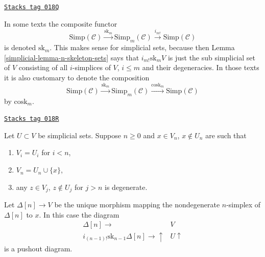 \begin{remark}[Sk literature]
\label{simplicial-remark-sk-literature}
\href{https://stacks.math.columbia.edu/tag/018Q}{\texttt{Stacks tag 018Q}}

In some texts the composite functor
$$
\text{Simp}(\mathcal{C})
\xrightarrow{\text{sk}_m}
\text{Simp}_m(\mathcal{C})
\xrightarrow{i_{m!}}
\text{Simp}(\mathcal{C})
$$
is denoted $\text{sk}_m$. This makes sense for simplicial sets,
because then Lemma \ref{simplicial-lemma-n-skeleton-sets} says
that $i_{m!} \text{sk}_m V$ is just the sub simplicial set
of $V$ consisting of all $i$-simplices of $V$, $i \leq m$
and their degeneracies. In those texts it is also customary
to denote the composition
$$
\text{Simp}(\mathcal{C})
\xrightarrow{\text{sk}_m}
\text{Simp}_m(\mathcal{C})
\xrightarrow{\text{cosk}_m}
\text{Simp}(\mathcal{C})
$$
by $\text{cosk}_m$.
\end{remark}

\begin{lemma}
\label{simplicial-lemma-glue-simplex}
\href{https://stacks.math.columbia.edu/tag/018R}{\texttt{Stacks tag 018R}}

Let $U \subset V$ be simplicial sets.
Suppose $n \geq 0$ and $x \in V_n$, $x \not \in U_n$ are such that
\begin{enumerate}
\item $V_i = U_i$ for $i < n$,
\item $V_n = U_n \cup \{x\}$,
\item any $z \in V_j$, $z \not \in U_j$ for $j > n$
is degenerate.
\end{enumerate}
Let $\Delta[n] \to V$ be the unique morphism mapping the
nondegenerate $n$-simplex of $\Delta[n]$ to $x$.
In this case the diagram
$$
\begin{array}{cc}\Delta[n] \longrightarrow & V \\ i_{(n - 1)!} \text{sk}_{n - 1} \Delta[n] \longrightarrow\uparrow & U \uparrow\end{array}
$$
is a pushout diagram.
\end{lemma}

